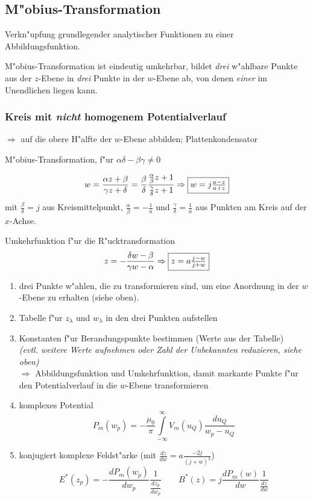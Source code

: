 \subsection{M"obius-Transformation}
Verkn"upfung grundlegender analytischer Funktionen zu einer Abbildungsfunktion.

M"obius-Transformation ist eindeutig umkehrbar, bildet {\it drei} w"ahlbare Punkte
aus der $z$-Ebene in {\it drei} Punkte in der $w$-Ebene ab, von denen {\it einer} im
Unendlichen liegen kann.

\subsubsection{Kreis mit {\bf\it nicht}\/ homogenem Potentialverlauf}
      $\Rightarrow$ auf die obere H"alfte der $w$-Ebene abbilden;
      Plattenkondensator

M"obius-Transformation, f"ur $\alpha \delta - \beta \gamma \not= 0$

$$w=\frac{\alpha z+\beta}{\gamma z+\delta} =\frac{\beta}{\delta}
\frac{\frac{\alpha}{\beta}z+1}{\frac{\gamma}{\delta}z+1} \Rightarrow
\fbox{$w=j\frac{a-z}{a+z}$}$$ mit $\frac{\beta}{\delta}=j$ aus Kreismittelpunkt,
$\frac{\alpha}{\beta}=-\frac{1}{a}$ und $\frac{\gamma}{\delta}=\frac{1}{a}$ aus
Punkten am Kreis auf der $x$-Achse.

Umkehrfunktion f"ur die R"ucktransformation
$$z=-\frac{\delta w-\beta}{\gamma w-\alpha} \Rightarrow
\fbox{$z=a\frac{j-w}{j+w}$}$$

\begin{enumerate}
\item drei Punkte w"ahlen, die zu transformieren sind, um eine  Anordnung
      in der $w$-Ebene zu erhalten (siehe oben).
\item Tabelle f"ur $z_\lambda$ und $w_\lambda$ in den drei Punkten aufstellen
\item Konstanten f"ur Berandungspunkte bestimmen (Werte aus der Tabelle)\\
      {\sl (evtl. weitere Werte aufnehmen oder Zahl der Unbekannten
      reduzieren, siehe oben)}\\
      $\Rightarrow$ Abbildungsfunktion und Umkehrfunktion, damit
      markante Punkte f"ur den Potentialverlauf in die $w$-Ebene
            transformieren
\item komplexes Potential
     $$P_m(w_p)=-\frac{\mu_0}{\pi}\int\limits_{-\infty}^\infty V_m(u_Q)
     \frac{du_Q}{w_p-u_Q}$$
\item konjugiert komplexe Feldst"arke (mit $\frac{dz}{dw}= a\frac{-2j}{(j+w)^2}$)
      $$E^\ast(z_p)=-\frac{dP_m(w_p)}{dw_p}\frac{1}{\frac{dz_p}{dw_p}} \qquad
      B^\ast(z)=j\frac{dP_m(w)}{dw} \frac{1}{\frac{dz}{dw}}$$

\end{enumerate}

